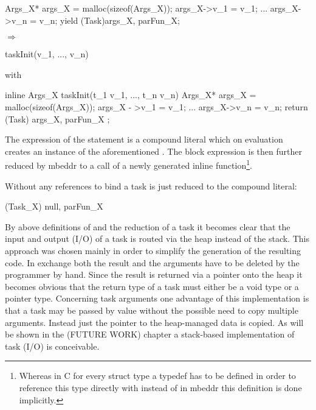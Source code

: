 \begin{minipage}{0.4\textwidth}
\begin{ccode}
{
  Args_X* args_X = malloc(sizeof(Args_X));
  args_X->v_1 = v_1;
  ...
  args_X->v_n = v_n;
  yield (Task){args_X, parFun_X};
}
\end{ccode}
\end{minipage}
\begin{minipage}{0.2\textwidth}
$\Longrightarrow$
\end{minipage}
\begin{minipage}{0.4\textwidth}
\begin{ccode}
taskInit(v_1, ..., v_n)
\end{ccode}
with
\begin{ccode}
inline Args_X taskInit(t_1 v_1, ..., t_n v_n) {
  Args_X* args_X = malloc(sizeof(Args_X));
  args_X - >v_1 = v_1;
  ...
  args_X->v_n = v_n;
  return (Task){ args_X, parFun_X };
}
\end{ccode}
\end{minipage}

The expression of the  statement is a compound literal which on evaluation creates an instance of the aforementioned . The block expression is then further reduced by mbeddr to a call of a newly generated inline function\footnote{Whereas in C for every struct type  a typedef has to be defined in order to reference this type directly with  instead of  in mbeddr this definition is done implicitly.}.

Without any references to bind a task is just reduced to the compound literal:

\begin{ccode}
(Task_X){ null, parFun_X }
\end{ccode}

By above definitions of  and the reduction of a task it becomes clear that the input and output (I/O) of a task is routed via the heap instead of the stack. This approach was chosen mainly in order to simplify the generation of the resulting code. In exchange both the result and the arguments have to be deleted by the programmer by hand. Since the result is returned via a pointer onto the heap it becomes obvious that the return type of a task must either be a void type or a pointer type. Concerning task arguments one advantage of this implementation is that a task may be passed by value without the possible need to copy multiple arguments. Instead just the pointer to the heap-managed data is copied. As will be shown in the (FUTURE WORK) chapter a stack-based implementation of task (I/O) is conceivable. 


